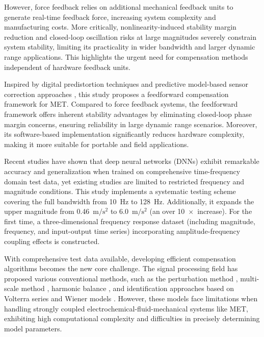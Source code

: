 \documentclass[journal]{IEEEtran}
\newcommand{\valFreqScanStart}{10}
\newcommand{\valFreqScanEnd}{128}
\newcommand{\valMagScanEnd}{6.0}
\begin{document}
However, force feedback relies on additional mechanical feedback units to generate real-time feedback force, increasing system complexity and manufacturing costs. More critically, nonlinearity-induced stability margin reduction and closed-loop oscillation risks at large magnitudes severely constrain system stability, limiting its practicality in wider bandwidth and larger dynamic range applications. This highlights the urgent need for compensation methods independent of hardware feedback units. 

Inspired by digital predistortion techniques \cite{wangInputAmplitudeBasedAdaptive2024} and predictive model-based sensor correction approaches \cite{WOS:001409548400009}, this study proposes a feedforward compensation framework for MET. Compared to force feedback systems, the feedforward framework offers inherent stability advantages by eliminating closed-loop phase margin concerns, ensuring reliability in large dynamic range scenarios. Moreover, its software-based implementation significantly reduces hardware complexity, making it more suitable for portable and field applications.

    Recent studies have shown that deep neural networks (DNNs) exhibit remarkable accuracy and generalization when trained on comprehensive time-frequency domain test data\cite{HOFLER2024136528}, yet existing studies are limited to restricted frequency and magnitude conditions. This study implements a systematic testing scheme covering the full bandwidth from \valFreqScanStart~Hz to \valFreqScanEnd~Hz. Additionally, it expands the upper magnitude from 0.46~$\text{m}/\text{s}^2$ \cite{WOS:000408118700046} to \valMagScanEnd~$\text{m}/\text{s}^2$ (an over 10~$\times$~increase). For the first time, a three-dimensional frequency response dataset (including magnitude, frequency, and input-output time series) incorporating amplitude-frequency coupling effects is constructed.


    With comprehensive test data available, developing efficient compensation algorithms becomes the new core challenge. The signal processing field has proposed various conventional methods, such as the perturbation method \cite{royOptimalModifiedHomotopy2023}, multi-scale method \cite{jainModelOrderReduction2020}, harmonic balance \cite{shawHybridAveragingHarmonic2023}, and identification approaches based on Volterra series \cite{helieInputOutputReduced2021} and Wiener models \cite{sersourNonlinearSystemIdentification2018}. However, these models face limitations when handling strongly coupled electrochemical-fluid-mechanical systems like MET, exhibiting high computational complexity and difficulties in precisely determining model parameters.
\end{document}
